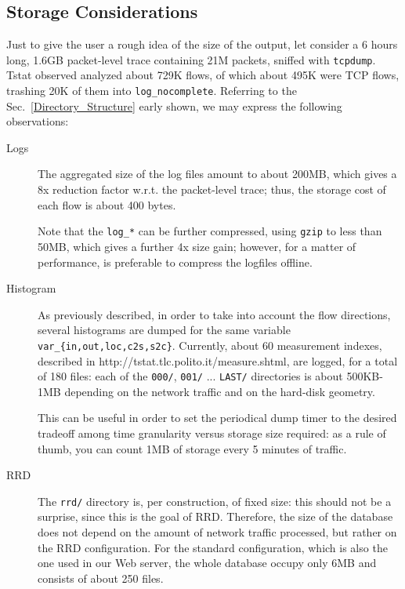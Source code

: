 \documentclass[11pt]{article}
\begin{document}
\subsection{Storage Considerations\label{Storage_Considerations}}


Just to give the user a rough idea of the size of the output,
let consider a 6 hours long, 1.6GB packet-level trace containing 
21M packets, sniffed with \texttt{tcpdump}.
Tstat observed analyzed about 729K flows, of which about 495K were 
TCP flows, trashing 20K of them into \texttt{log\_nocomplete}.
Referring to the Sec.~\ref{Directory_Structure} early shown,
we may express the following observations:

\begin{description}

\item[Logs] \mbox{}

The aggregated size of the log files amount to about 200MB, which 
gives  a 8x reduction factor w.r.t. the packet-level trace; thus,
the storage cost of each flow is about 400 bytes.



Note that the \texttt{log\_*} can be further compressed, using \texttt{gzip}
to less than 50MB, which gives a further 4x size gain; 
however, for a matter of performance, is preferable 
to compress the logfiles offline.


\item[Histogram] \mbox{}

As previously described, in order to take into account the flow directions, 
several histograms are dumped for the same variable \texttt{var\_\{in,out,loc,c2s,s2c\}}.
Currently, about 60 measurement indexes, described in 
\textsf{http://tstat.tlc.polito.it/measure.shtml},  are logged, for a total
of 180 files: each of the \texttt{000/}, \texttt{001/} ... \texttt{LAST/} directories is about
500KB-1MB depending on the network traffic and on the hard-disk
geometry.



This can be useful in order to set the periodical dump timer
to the desired tradeoff among time granularity versus storage size 
required: as a rule of thumb, you can count 1MB of storage every 5 minutes
of traffic.


\item[RRD] \mbox{}

The \texttt{rrd/} directory is, per construction, of fixed size: this should
not be a surprise, since this is the goal of RRD. Therefore, the size
of the database does not depend on the amount of network traffic processed,
but rather on the RRD configuration.
For the standard configuration, which is also the one used in
our Web server, the whole database occupy only 6MB and consists
of about 250 files.

\end{description}
\end{document}

